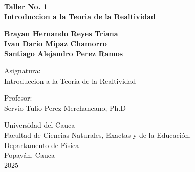 \begin{titlepage}
    \begin{center}

        {\fontsize{17}{17}\selectfont \textbf{{Taller No. 1 \\ Introduccion a la Teoria de la Realtividad }}}
            
        \vfill

        {\textbf{
        Brayan Hernando Reyes Triana\\
        Ivan Dario Mipaz Chamorro\\
        Santiago Alejandro Perez Ramos}
        }
               
        \vfill
        
        {Asignatura:}\\
        {Introduccion a la Teoria de la Realtividad}
        
        \vfill
        
        {Profesor:}\\
        {Servio Tulio Perez Merchancano}, {Ph.D}

        
        \vfill

        {Universidad del Cauca}\\
        {Facultad de Ciencias Naturales, Exactas y de la Educación, \\Departamento de Física}\\
        {Popayán, Cauca}\\
        {2025}
        
        \end{center}
\end{titlepage}
